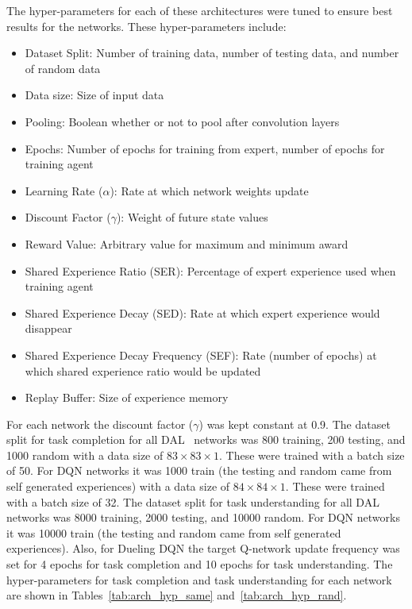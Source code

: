\documentclass[12pt,american]{report}
\begin{document}
The hyper-parameters for each of these architectures were tuned to ensure best results for the networks.  These hyper-parameters include:
\begin{itemize}
  \item Dataset Split: Number of training data, number of testing data, and number of random data
  \item Data size: Size of input data
  \item Pooling: Boolean whether or not to pool after convolution layers
  \item Epochs: Number of epochs for training from expert, number of epochs for training agent
  \item Learning Rate ($\alpha$): Rate at which network weights update
  \item Discount Factor ($\gamma$): Weight of future state values
  \item Reward Value: Arbitrary value for maximum and minimum award
  \item Shared Experience Ratio (SER): Percentage of expert experience used when training agent
  \item Shared Experience Decay (SED): Rate at which expert experience would disappear
  \item Shared Experience Decay Frequency (SEF): Rate (number of epochs) at which shared experience ratio would be updated
  \item Replay Buffer: Size of experience memory
\end{itemize}

For each network the discount factor ($\gamma$) was kept constant at 0.9.  The dataset split for task completion for all DAL~\cite{markovikj2014deep} networks was 800 training, 200 testing, and 1000 random with a data size of $83\times 83\times 1$.  These were trained with a batch size of 50. For DQN networks it was 1000 train (the testing and random came from self generated experiences) with a data size of $84\times 84\times 1$. These were trained with a batch size of 32. The dataset split for task understanding for all DAL networks was 8000 training, 2000 testing, and 10000 random. For DQN networks it was 10000 train (the testing and random came from self generated experiences).  Also, for Dueling DQN the target Q-network update frequency was set for 4 epochs for task completion and 10 epochs for task understanding. The hyper-parameters for task completion and task understanding for each network are shown in Tables~\ref{tab:arch_hyp_same} and~\ref{tab:arch_hyp_rand}.
\end{document}
